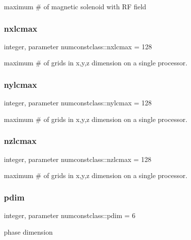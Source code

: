maximum \# of magnetic solenoid with RF field 

\mbox{\label{namespacenumconstclass_a8219d90b9dea3ecb8b630e32e3c86026}} 
\subsubsection{\texorpdfstring{nxlcmax}{nxlcmax}}
{\footnotesize\ttfamily integer, parameter numconstclass\+::nxlcmax = 128}



maximum \# of grids in x,y,z dimension on a single processor. 

\mbox{\label{namespacenumconstclass_ab087d448ac5f3b93904c966d5790fdf2}} 
\subsubsection{\texorpdfstring{nylcmax}{nylcmax}}
{\footnotesize\ttfamily integer, parameter numconstclass\+::nylcmax = 128}



maximum \# of grids in x,y,z dimension on a single processor. 

\mbox{\label{namespacenumconstclass_a11dbfc82160f0abca94e67bc7811d3ea}} 
\subsubsection{\texorpdfstring{nzlcmax}{nzlcmax}}
{\footnotesize\ttfamily integer, parameter numconstclass\+::nzlcmax = 128}



maximum \# of grids in x,y,z dimension on a single processor. 

\mbox{\label{namespacenumconstclass_a24da80ebccca40a65c454aff1bd28e7f}} 
\subsubsection{\texorpdfstring{pdim}{pdim}}
{\footnotesize\ttfamily integer, parameter numconstclass\+::pdim = 6}



phase dimension 

